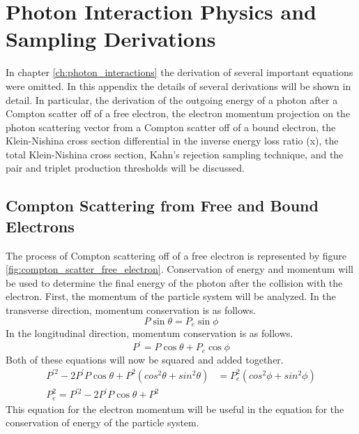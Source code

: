 \chapter{Photon Interaction Physics and Sampling Derivations}
\label{ch:appendix_B}
In chapter \ref{ch:photon_interactions} the derivation of several important
equations were omitted. In this appendix the details of several derivations will
be shown in detail. In particular, the derivation of the outgoing energy of a
photon after a Compton scatter off of a free electron, the electron momentum 
projection on the photon scattering vector from a Compton scatter off of a
bound electron, the Klein-Nishina cross section differential in the inverse
energy loss ratio (x), the total Klein-Nishina cross section, Kahn's
rejection sampling technique, and the pair and triplet production thresholds
will be discussed.

\section{Compton Scattering from Free and Bound Electrons}
The process of Compton scattering off of a free electron is represented by 
figure \ref{fig:compton_scatter_free_electron}. Conservation of energy and 
momentum will be used to determine the final energy of the photon after the 
collision with the electron. First, the momentum of the particle system will be 
analyzed. In the transverse direction, momentum conservation is as follows.
\begin{equation*}
  P\sin{\theta} = P_e\sin{\phi}
\end{equation*}
In the longitudinal direction, momentum conservation is as follows.
\begin{equation*}
  P^{'} = P\cos{\theta} + P_e\cos{\phi} 
\end{equation*}
Both of these equations will now be squared and added together.
\begin{align}
  P^{'2} - 2P^{'}P\cos{\theta} + P^2(cos^2\theta + sin^2\theta) & = 
  P_e^2(cos^2\phi + sin^2\phi) \nonumber \\
  P_e^2 = P^{'2} - 2P^{'}P\cos{\theta} + P^2
\end{align}
This equation for the electron momentum will be useful in the equation for
the conservation of energy of the particle system.

